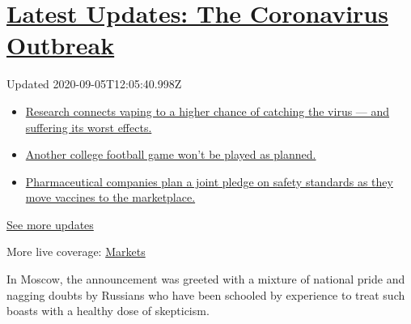 \hypertarget{latest-updates-the-coronavirus-outbreak}{%
\section{\texorpdfstring{\href{https://www.nytimes3xbfgragh.onion/2020/09/04/world/covid-19-coronavirus.html?action=click\&pgtype=Article\&state=default\&region=MAIN_CONTENT_1\&context=storylines_live_updates}{Latest
Updates: The Coronavirus
Outbreak}}{Latest Updates: The Coronavirus Outbreak}}\label{latest-updates-the-coronavirus-outbreak}}

Updated 2020-09-05T12:05:40.998Z

\begin{itemize}
\tightlist
\item
  \href{https://www.nytimes3xbfgragh.onion/2020/09/04/world/covid-19-coronavirus.html?action=click\&pgtype=Article\&state=default\&region=MAIN_CONTENT_1\&context=storylines_live_updates\#link-1654f6ad}{Research
  connects vaping to a higher chance of catching the virus --- and
  suffering its worst effects.}
\item
  \href{https://www.nytimes3xbfgragh.onion/2020/09/04/world/covid-19-coronavirus.html?action=click\&pgtype=Article\&state=default\&region=MAIN_CONTENT_1\&context=storylines_live_updates\#link-52e4198a}{Another
  college football game won't be played as planned.}
\item
  \href{https://www.nytimes3xbfgragh.onion/2020/09/04/world/covid-19-coronavirus.html?action=click\&pgtype=Article\&state=default\&region=MAIN_CONTENT_1\&context=storylines_live_updates\#link-181cef0}{Pharmaceutical
  companies plan a joint pledge on safety standards as they move
  vaccines to the marketplace.}
\end{itemize}

\href{https://www.nytimes3xbfgragh.onion/2020/09/04/world/covid-19-coronavirus.html?action=click\&pgtype=Article\&state=default\&region=MAIN_CONTENT_1\&context=storylines_live_updates}{See
more updates}

More live coverage:
\href{https://www.nytimes3xbfgragh.onion/live/2020/09/04/business/stock-market-today-coronavirus?action=click\&pgtype=Article\&state=default\&region=MAIN_CONTENT_1\&context=storylines_live_updates}{Markets}

In Moscow, the announcement was greeted with a mixture of national pride
and nagging doubts by Russians who have been schooled by experience to
treat such boasts with a healthy dose of skepticism.

